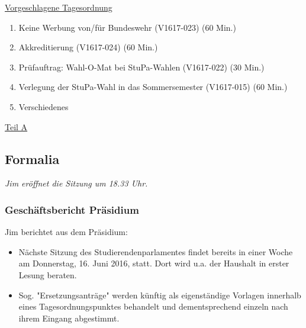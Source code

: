 \documentclass[ngerman,headheight=70pt]{scrartcl}
\begin{document}
    \newpage
    \underline{Vorgeschlagene Tagesordnung}
    \begin{enumerate}[label={\textbf{Top \theenumi}},leftmargin=*]
        \item Keine Werbung von/für Bundeswehr (V1617-023) (60 Min.)
        \item Akkreditierung (V1617-024) (60 Min.)
        \item Prüfauftrag: Wahl-O-Mat bei StuPa-Wahlen (V1617-022) (30 Min.)
        \item Verlegung der StuPa-Wahl in das Sommersemester (V1617-015) (60 Min.)
        \item Verschiedenes
    \end{enumerate}

    \newpage


    {\Large \underline{Teil A}}

    \subsection{Formalia}

    \textit{Jim eröffnet die Sitzung um 18.33 Uhr.}

    \subsubsection{Geschäftsbericht Präsidium}

    Jim berichtet aus dem Präsidium:
    \begin{itemize}
        \item Nächste Sitzung des Studierendenparlamentes findet bereits in einer
        Woche am Donnerstag, 16. Juni 2016, statt. Dort wird u.a. der Haushalt in
        erster Lesung beraten.
        \item Sog. "Ersetzungsanträge" werden künftig als eigenständige Vorlagen
        innerhalb eines Tagesordnungspunktes behandelt und dementsprechend
        einzeln nach ihrem Eingang abgestimmt.
    \end{itemize}
\end{document}
